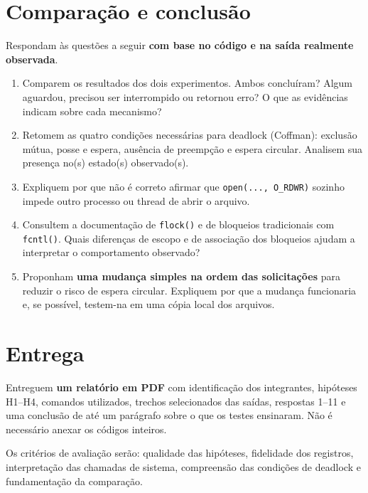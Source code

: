 \documentclass[11pt,a4paper]{article}
\begin{document}
\newpage
\section{Comparação e conclusão}
Respondam às questões a seguir \textbf{com base no código e na saída realmente observada}.
\begin{enumerate}[label=\arabic*.,start=7]
\item Comparem os resultados dos dois experimentos. Ambos concluíram? Algum aguardou, precisou ser interrompido ou retornou erro? O que as evidências indicam sobre cada mecanismo?
\item Retomem as quatro condições necessárias para deadlock (Coffman): exclusão mútua, posse e espera, ausência de preempção e espera circular. Analisem sua presença no(s) estado(s) observado(s).
\item Expliquem por que não é correto afirmar que \texttt{open(..., O\_RDWR)} sozinho impede outro processo ou thread de abrir o arquivo.
\item Consultem a documentação de \texttt{flock()} e de bloqueios tradicionais com \texttt{fcntl()}. Quais diferenças de escopo e de associação dos bloqueios ajudam a interpretar o comportamento observado?
\item Proponham \textbf{uma mudança simples na ordem das solicitações} para reduzir o risco de espera circular. Expliquem por que a mudança funcionaria e, se possível, testem-na em uma cópia local dos arquivos.
\end{enumerate}

\section{Entrega}
Entreguem \textbf{um relatório em PDF} com identificação dos integrantes, hipóteses H1--H4, comandos utilizados, trechos selecionados das saídas, respostas 1--11 e uma conclusão de até um parágrafo sobre o que os testes ensinaram. Não é necessário anexar os códigos inteiros.

Os critérios de avaliação serão: qualidade das hipóteses, fidelidade dos registros, interpretação das chamadas de sistema, compreensão das condições de deadlock e fundamentação da comparação.
\end{document}
